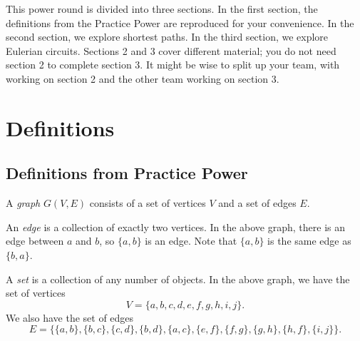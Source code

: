 \documentclass[11pt]{article}
\begin{document}
This power round is divided into three sections. In the first section, the definitions from the Practice Power are reproduced for your convenience.
In the second section, we explore shortest paths. In the third section, we explore Eulerian circuits. Sections 2 and 3 cover different material;
you do not need section 2 to complete section 3. It might be wise to split up your team, with  working on section 2 and the other team working
on section 3.

\section{Definitions}

\subsection{Definitions from Practice Power}

\begin{definition}
\label{def:graph}
A \textit{graph} $G(V,E)$ consists of a set of vertices $V$ and a set of edges $E$. 

\begin{center}
\end{center}
\end{definition}

\begin{definition}
\label{def:edge}
An \textit{edge} is a collection of exactly two vertices. In the above graph, there is an edge
between $a$ and $b$, so $\{a, b\}$ is an edge. Note that $\{a,b\}$ is the same edge as $\{b,a\}$.
\end{definition}

\begin{definition}
\label{def:set}
A \textit{set} is a collection of any number of objects. In the above graph, we have the set of vertices
\[V=\{a, b, c, d, e, f, g, h, i, j\}.\]
We also have the set of edges
\[E=\{\{a,b\}, \{b,c\}, \{c,d\},\{b,d\},\{a,c\},\{e,f\},\{f,g\},\{g,h\},\{h,f\},\{i,j\} \}.\]
\end{definition}
\end{document}
